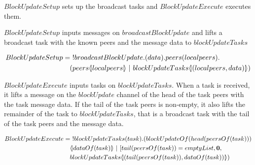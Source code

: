 $BlockUpdateSetup$ sets up the broadcast tasks and $BlockUpdateExecute$ executes them.

$BlockUpdateSetup$ inputs messages on $broadcastBlockUpdate$ and lifts a broadcast task with the known peers and the message data to $blockUpdateTasks$

\begin{align*}
    BlockUpdateSetup &=\ !broadcastBlockUpdate.(data).peers(localpeers).\\
    &\quad (peers\lift{}{localpeers}\ |\ blockUpdateTasks\lift{}{(localpeers,data)})
\end{align*}

$BlockUpdateExecute$ inputs tasks on $blockUpdateTasks$.
When a task is received, it lifts a message on the $blockUpdate$ channel of the head of the task peers with the task message data.
If the tail of the task peers is non-empty, it also lifts the remainder of the task to $blockUpdateTasks$, that is a broadcast task with the tail of the task peers and the message data.

\begin{align*}
    BlockUpdateExecute &=\ !blockUpdateTasks(task).(blockUpdateOf(head(peersOf(task)))\\
    &\quad \lift{}{dataOf(task)}\ |\ [tail(peersOf(task))=emptyList,\nil,\\
    &\quad blockUpdateTasks\lift{}{(tail(peersOf(task)),dataOf(task))})
\end{align*}
